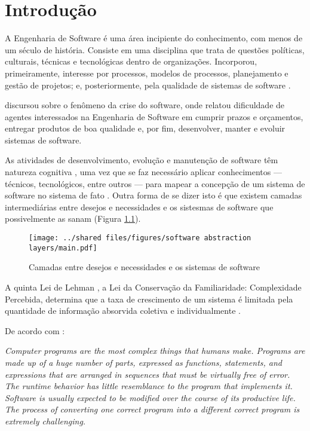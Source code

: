 
%

\chapter{Introdução}
\label{chap:Introdução}

A Engenharia de Software é uma área incipiente do conhecimento, com menos
de um século de história. Consiste em uma disciplina que trata de questões
políticas, culturais, técnicas e tecnológicas dentro de organizações.
Incorporou, primeiramente, interesse por processos, modelos de processos,
planejamento e gestão de projetos; e, posteriormente, pela qualidade de
sistemas de software \cite{Wazlawick2013:Engenharia}.

 discursou sobre o fenômeno da crise
do software, onde relatou dificuldade de agentes interessados na Engenharia de
Software em cumprir prazos e orçamentos, entregar produtos de boa qualidade e,
por fim, desenvolver, manter e evoluir sistemas de software.

As atividades de desenvolvimento, evolução e manutenção de software têm natureza
cognitiva \cite{Letovsky1987:Cognitive}, uma vez que se faz necessário aplicar
conhecimentos --- técnicos, tecnológicos, entre outros --- para mapear a
concepção de um sistema de software no sistema de fato
\cite{Brooks1983:TheoryComprehension}. Outra forma de se dizer isto é que 
existem camadas intermediárias entre desejos e necessidades e os sistesmas
de software que possivelmente as sanam (Figura \ref{fig:CamadasAbstraçãoSoftware}).

\begin{figure}[!htb]
    \centering
    \caption{Camadas entre desejos e necessidades e os sistemas de software}
    \texttt{[image: ../shared files/figures/software abstraction layers/main.pdf]}
    \label{fig:CamadasAbstraçãoSoftware}
\end{figure}

A quinta Lei de Lehman \cite{Lehman1980:Laws}, a Lei da Conservação da
Familiaridade: Complexidade Percebida, determina que a taxa de crescimento de
um sistema é limitada pela quantidade de informação absorvida coletiva e
individualmente \cite{Wazlawick2013:Engenharia}.

De acordo com :

\begin{citacao}
\textit{Computer programs are the most complex things that humans make. Programs
are made up of a huge number of parts, expressed as functions, statements, and
expressions that are arranged in sequences that must be virtually free of error.
The runtime behavior has little resemblance to the program that implements it.
Software is usually expected to be modified over the course of its productive
life. The process of converting one correct program into a different correct
program is extremely challenging.}
\end{citacao}

